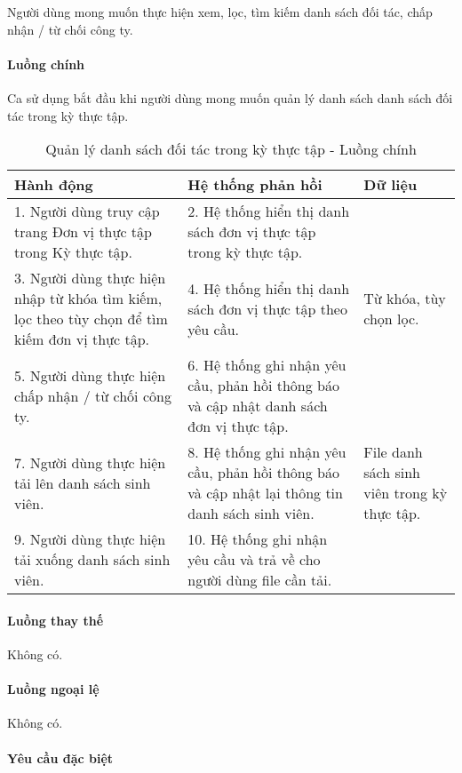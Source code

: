 \documentclass[./../main.tex]{subfiles}
\begin{document}
Người dùng mong muốn thực hiện xem, lọc, tìm kiếm danh sách đối tác, chấp nhận / từ chối công ty.

\paragraph*{Luồng chính} Ca sử dụng bắt đầu khi người dùng mong muốn quản lý danh sách danh sách đối tác trong kỳ thực tập.

\begin{table}[H]
  \caption{Quản lý danh sách đối tác trong kỳ thực tập - Luồng chính}
  \label{tab:orgAdmin_manage_internship_partners}
  \begin{tabularx}{\textwidth}{|X|X|X|}
    \hline
\textbf{Hành động} & \textbf{Hệ thống phản hồi} & \textbf{Dữ liệu} \\ \hline
1. Người dùng truy cập trang Đơn vị thực tập trong Kỳ thực tập. & 2. Hệ thống hiển thị danh sách đơn vị thực tập trong kỳ thực tập. &  \\ \hline
3. Người dùng thực hiện nhập từ khóa tìm kiếm, lọc theo tùy chọn để tìm kiếm đơn vị thực tập. & 4. Hệ thống hiển thị danh sách đơn vị thực tập theo yêu cầu. & Từ khóa, tùy chọn lọc. \\ \hline
5. Người dùng thực hiện chấp nhận / từ chối công ty. & 6. Hệ thống ghi nhận yêu cầu, phản hồi thông báo và cập nhật danh sách đơn vị thực tập. &  \\ \hline
7. Người dùng thực hiện tải lên danh sách sinh viên. & 8. Hệ thống ghi nhận yêu cầu, phản hồi thông báo và cập nhật lại thông tin danh sách sinh viên. & File danh sách sinh viên trong kỳ thực tập. \\ \hline
9. Người dùng thực hiện tải xuống danh sách sinh viên. & 10. Hệ thống ghi nhận yêu cầu và trả về cho người dùng file cần tải. &  \\ \hline
  \end{tabularx}
\end{table}

\paragraph*{Luồng thay thế} Không có.

\paragraph*{Luồng ngoại lệ} Không có.

\paragraph*{Yêu cầu đặc biệt}
\end{document}
